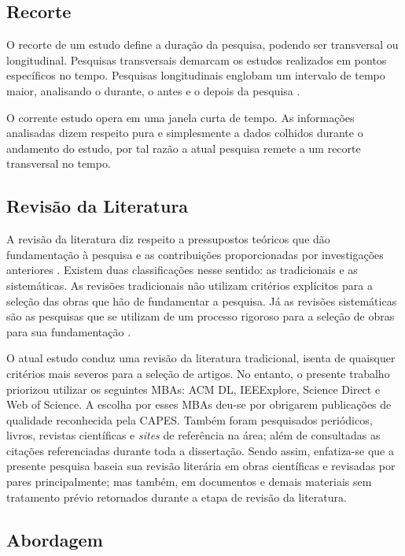 \subsection{Recorte}\label{sub:Recorte}

O recorte de um estudo define a duração da pesquisa, podendo ser transversal ou longitudinal. Pesquisas transversais demarcam os estudos realizados em pontos específicos no tempo. Pesquisas longitudinais englobam um intervalo de tempo maior, analisando o durante, o antes e o depois da pesquisa \cite{hochman2005desenhos}. 

O corrente estudo opera em uma janela curta de tempo. As informações analisadas dizem respeito pura e simplesmente a dados colhidos durante o andamento do estudo, por tal razão a atual pesquisa remete a um recorte transversal no tempo. 

\subsection{Revisão da Literatura}\label{sub:Literatura}

A revisão da literatura diz respeito a pressupostos teóricos que dão fundamentação à pesquisa e as contribuições proporcionadas por investigações anteriores \cite{carlos2002elaborar}. Existem duas classificações nesse sentido: as tradicionais e as sistemáticas. As revisões tradicionais não utilizam critérios explícitos para a seleção das obras que hão de fundamentar a pesquisa. Já as revisões sistemáticas são as pesquisas que se utilizam de um processo rigoroso para a seleção de obras para sua fundamentação \cite{ferenhof2016desmistificando}.

O atual estudo conduz uma revisão da literatura tradicional, isenta de quaisquer critérios mais severos para a seleção de artigos. No entanto, o presente trabalho priorizou utilizar os seguintes \acfp{MBA}: ACM DL, IEEExplore, Science Direct e Web of Science. A escolha por esses \acp{MBA} deu-se por obrigarem publicações de qualidade reconhecida pela \ac{CAPES}. Também foram pesquisados periódicos, livros, revistas científicas e \textit{sites} de referência na área; além de consultadas as citações referenciadas durante toda a dissertação. Sendo assim, enfatiza-se que a presente pesquisa baseia sua revisão literária em obras científicas e revisadas por pares principalmente; mas também, em documentos e demais materiais sem tratamento prévio retornados durante a etapa de revisão da literatura. 

\subsection{Abordagem}\label{sub:Abordagem}

